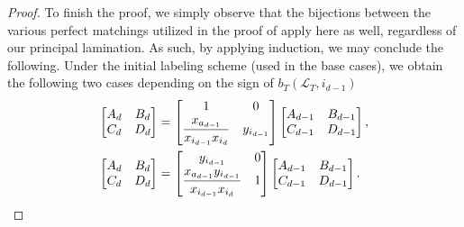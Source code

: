 \documentclass[pdftex]{sigma}
\numberwithin{equation}{section}
\theoremstyle{definition}
\begin{document}
\begin{proof}
To finish the proof, we simply observe that the bijections between the various perfect matchings utilized in the proof of \cite[Proposition 5.5]{MW13} apply here as well, regardless of our principal lamination. As such, by applying induction, we may conclude the following. Under the initial labeling scheme (used in the base cases), we obtain the following two cases depending on the sign of $b_T(\mathcal{L}_T, i_{d-1})$
\begin{align*}
 \begin{bmatrix}
 A_d & B_d\\
 C_d & D_d
 \end{bmatrix}&=
\begin{bmatrix}
 1 & 0\vspace{1mm}\\
 \dfrac{x_{a_{d-1}}}{x_{i_{d-1}}x_{i_d}} & y_{i_{d-1}}
\end{bmatrix}
\begin{bmatrix}
 A_{d-1} & B_{d-1}\\
 C_{d-1} & D_{d-1}
 \end{bmatrix},
 \\
 \begin{bmatrix}
 A_d & B_d\\
 C_d & D_d
 \end{bmatrix}&=
\begin{bmatrix}
 y_{i_{d-1}} & 0\vspace{1mm}\\
 \dfrac{x_{a_{d-1}}y_{i_{d-1}}}{x_{i_{d-1}}x_{i_d}} & 1
\end{bmatrix}
\begin{bmatrix}
 A_{d-1} & B_{d-1}\\
 C_{d-1} & D_{d-1}
 \end{bmatrix}.
\end{align*}


\end{proof}
\end{document}
